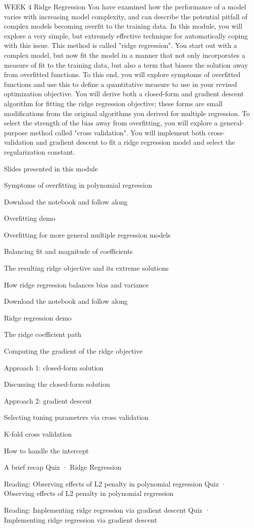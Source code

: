 WEEK 4
Ridge Regression
You have examined how the performance of a model varies with increasing model complexity, and can describe the potential pitfall of complex models becoming overfit to the training data. In this module, you will explore a very simple, but extremely effective technique for automatically coping with this issue. This method is called "ridge regression". You start out with a complex model, but now fit the model in a manner that not only incorporates a measure of fit to the training data, but also a term that biases the solution away from overfitted functions. To this end, you will explore symptoms of overfitted functions and use this to define a quantitative measure to use in your revised optimization objective. You will derive both a closed-form and gradient descent algorithm for fitting the ridge regression objective; these forms are small modifications from the original algorithms you derived for multiple regression. To select the strength of the bias away from overfitting, you will explore a general-purpose method called "cross validation".
You will implement both cross-validation and gradient descent to fit a ridge regression model and select the regularization constant.

\item Slides presented in this module
\item Symptoms of overfitting in polynomial regression
\item Download the notebook and follow along
\item Overfitting demo
\item Overfitting for more general multiple regression models
\item Balancing fit and magnitude of coefficients
\item The resulting ridge objective and its extreme solutions
\item How ridge regression balances bias and variance
\item Download the notebook and follow along
\item Ridge regression demo
\item The ridge coefficient path
\item Computing the gradient of the ridge objective
\item Approach 1: closed-form solution
\item Discussing the closed-form solution
\item Approach 2: gradient descent
\item Selecting tuning parameters via cross validation
\item K-fold cross validation
\item How to handle the intercept
\item A brief recap
Quiz · Ridge Regression
\item Reading: Observing effects of L2 penalty in polynomial regression
Quiz · Observing effects of L2 penalty in polynomial regression
\item Reading: Implementing ridge regression via gradient descent
Quiz · Implementing ridge regression via gradient descent
